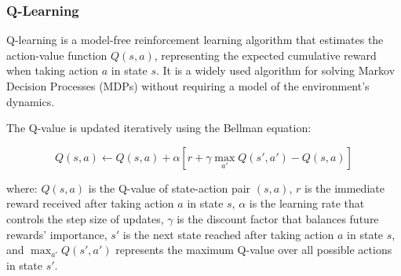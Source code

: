 \subsubsection{Q-Learning}\label{subsubsec:q-learning}

Q-learning is a model-free reinforcement learning algorithm that estimates the action-value function \(Q(s, a)\), representing the expected cumulative reward when taking action \(a\) in state \(s\). It is a widely used algorithm for solving Markov Decision Processes (MDPs) without requiring a model of the environment's dynamics.

The Q-value is updated iteratively using the Bellman equation:

\[Q(s, a) \leftarrow Q(s, a) + \alpha \left[ r + \gamma \max_{a'} Q(s', a') - Q(s, a) \right]\]

where:
\(Q(s, a)\) is the Q-value of state-action pair \((s, a)\),
\(r\) is the immediate reward received after taking action \(a\) in state \(s\),
\(\alpha\) is the learning rate that controls the step size of updates,
\(\gamma\) is the discount factor that balances future rewards' importance,
\(s'\) is the next state reached after taking action \(a\) in state \(s\), and
\(\max_{a'} Q(s', a')\) represents the maximum Q-value over all possible actions in state \(s'\).


